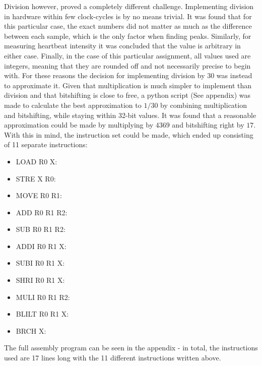\documentclass[12pt,a4paper]{article}
\begin{document}
	Division however, proved a completely different challenge. Implementing division in hardware within few clock-cycles is by no means trivial. It was found that for this particular case, the exact numbers did not matter as much as the difference between each sample, which is the only factor when finding peaks. Similarly, for measuring heartbeat intensity it was concluded that the value is arbitrary in either case. Finally, in the case of this particular assignment, all values used are integers, meaning that they are rounded off and not necessarily precise to begin with. For these reasons the decision for implementing division by 30 was instead to approximate it.
	Given that multiplication is much simpler to implement than division and that bitshifting is close to free, a python script (See appendix) was made to calculate the best approximation to $1/30$ by combining multiplication and bitshifting, while staying within 32-bit values.
	It was found that a reasonable approximation could be made by multiplying by $4369$ and bitshifting right by $17$. With this in mind, the instruction set could be made, which ended up consisting of 11 separate instructions:\\
	
	\begin{itemize}
			
			\item LOAD R0 X: \qquad[$R0=mem(X)$]
			\item STRE X R0: \;\qquad[$mem(X)=R0$]
			\item MOVE R0 R1: \,\,\quad[$R0=R1$]
			\item ADD R0 R1 R2: \quad[$R0=R1+R2$]
			\item SUB R0 R1 R2: \quad[$R0=R1-R2$]
			\item ADDI R0 R1 X: \quad[$R0=R1+X$]
			\item SUBI R0 R1 X: \quad[$R0=R1-X$]
			\item SHRI R0 R1 X: \quad[$R0=R1>>X$]
			\item MULI R0 R1 R2: \quad[$R0=R1*R2$]
			\item BLILT R0 R1 X: \quad[$if\;(R0>R1)\;goto\;X$]
			\item BRCH X: \qquad\qquad[$goto\;X$]
		\end{itemize}
	The full assembly program can be seen in the appendix - in total, the instructions used are 17 lines long with the 11 different instructions written above.
\end{document}

